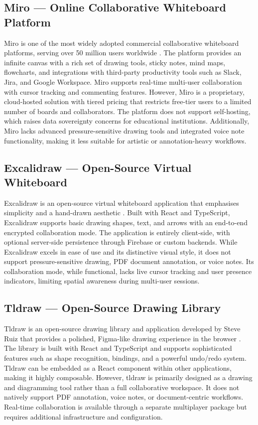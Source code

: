 \documentclass[12pt,a4paper]{report}
\begin{document}
\subsection{Miro — Online Collaborative Whiteboard Platform}

Miro is one of the most widely adopted commercial collaborative whiteboard platforms, serving over 50 million users worldwide \cite{ref1}. The platform provides an infinite canvas with a rich set of drawing tools, sticky notes, mind maps, flowcharts, and integrations with third-party productivity tools such as Slack, Jira, and Google Workspace. Miro supports real-time multi-user collaboration with cursor tracking and commenting features. However, Miro is a proprietary, cloud-hosted solution with tiered pricing that restricts free-tier users to a limited number of boards and collaborators. The platform does not support self-hosting, which raises data sovereignty concerns for educational institutions. Additionally, Miro lacks advanced pressure-sensitive drawing tools and integrated voice note functionality, making it less suitable for artistic or annotation-heavy workflows.

\subsection{Excalidraw — Open-Source Virtual Whiteboard}

Excalidraw is an open-source virtual whiteboard application that emphasises simplicity and a hand-drawn aesthetic \cite{ref3}. Built with React and TypeScript, Excalidraw supports basic drawing shapes, text, and arrows with an end-to-end encrypted collaboration mode. The application is entirely client-side, with optional server-side persistence through Firebase or custom backends. While Excalidraw excels in ease of use and its distinctive visual style, it does not support pressure-sensitive drawing, PDF document annotation, or voice notes. Its collaboration mode, while functional, lacks live cursor tracking and user presence indicators, limiting spatial awareness during multi-user sessions.

\subsection{Tldraw — Open-Source Drawing Library}

Tldraw is an open-source drawing library and application developed by Steve Ruiz that provides a polished, Figma-like drawing experience in the browser \cite{ref4}. The library is built with React and TypeScript and supports sophisticated features such as shape recognition, bindings, and a powerful undo/redo system. Tldraw can be embedded as a React component within other applications, making it highly composable. However, tldraw is primarily designed as a drawing and diagramming tool rather than a full collaborative workspace. It does not natively support PDF annotation, voice notes, or document-centric workflows. Real-time collaboration is available through a separate multiplayer package but requires additional infrastructure and configuration.
\end{document}
